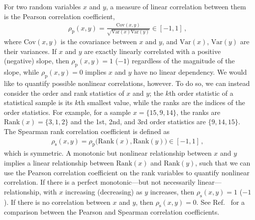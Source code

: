 \documentclass[%
reprint,
 amsmath,amssymb,
 aps,
 prd,nofootinbib,nobibnotes,
 superscriptaddress,groupedaddress,
]{revtex4-2}
\begin{document}
For two random variables $x$ and $y$, a measure of linear correlation between them is the Pearson correlation coefficient,
\begin{align}
\rho_\mathrm{p} ( x , y )
=
\frac{ \mathrm{Cov}(x,y) }{ \sqrt{ \mathrm{Var}(x) \mathrm{Var}(y) } }
\in
[ -1 , 1 ]
\, ,
\label{eq: Pearson}
\end{align}
where $\mathrm{Cov}(x,y)$ is the covariance between $x$ and $y$, and $\mathrm{Var}(x)$, $\mathrm{Var}(y)$ are their variances. If $x$ and $y$ are exactly linearly correlated with a positive (negative) slope, then $\rho_\mathrm{p}(x,y) = 1$ ($-1$) regardless of the magnitude of the slope, while $\rho_\mathrm{p}(x,y)=0$ implies $x$ and $y$ have no linear dependency. We would like to quantify possible nonlinear correlations, however. To do so, we can instead consider the order and rank statistics of $x$ and $y$; the $k$th order statistic of a statistical sample is its $k$th smallest value, while the ranks are the indices of the order statistics. For example, for a sample $x=\{15,9,14\}$, the ranks are $\mathrm{Rank}(x)=\{3,1,2\}$ and the 1st, 2nd, and 3rd order statistics are $\{9,14,15\}$. The Spearman rank correlation coefficient \cite{Spearman:1904abc, kendall1979advanced, Schweizer1981} is defined as
\begin{align}
\rho_\mathrm{s} ( x , y )
=
\rho_\mathrm{p} \big( \mathrm{Rank}(x) , \mathrm{Rank}(y) \big)
\in
[ -1 , 1 ]
\, ,
\label{eq: Spearman}
\end{align}
which is symmetric. A monotonic but nonlinear relationship between $x$ and $y$ implies a linear relationship between $\mathrm{Rank}(x)$ and $\mathrm{Rank}(y)$, such that we can use the Pearson correlation coefficient on the rank variables to quantify nonlinear correlation. If there is a perfect monotonic---but not necessarily linear---relationship, with $x$ increasing (decreasing) as $y$ increases, then $\rho_\mathrm{s}(x,y)=1$ ($-1$). If there is no correlation between $x$ and $y$, then $\rho_\mathrm{s}(x,y)=0$. See Ref.~\cite{Hauke:2011abc} for a comparison between the Pearson and Spearman correlation coefficients.
\end{document}
